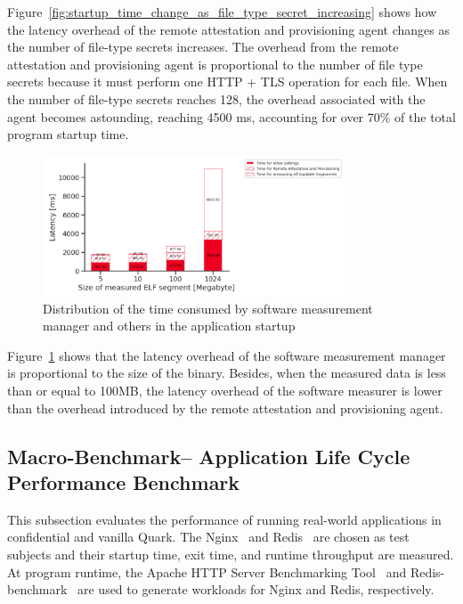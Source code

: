 Figure~\ref{fig:startup_time_change_as_file_type_secret_increasing} shows how the latency overhead of the remote attestation and provisioning agent changes as the number of file-type secrets increases. The overhead from the remote attestation and provisioning agent is proportional to the 
number of file type secrets because it must perform one HTTP + TLS operation for each file. When the number of file-type secrets reaches 128, the overhead associated with the agent becomes astounding, reaching 4500 ms, accounting for over 70\% of the total program startup time.
\begin{figure}[!htb]
    \centering
    \includegraphics[width=0.8\textwidth]{images/startup_time_change_as_elf_size_increasing.PNG}
    \caption[Distribution of the time consumed by software measurement manager and others in the Application Startup]{Distribution of the time consumed by software measurement manager and others in the application startup}
    \label{fig:startup_time_change_as_elf_size_increasing}
\end{figure}


Figure~\ref{fig:startup_time_change_as_elf_size_increasing} shows that the latency overhead of the software measurement manager is proportional to the size of the binary. Besides, when the measured data is less than or equal to 100MB, the latency overhead of the software measurer is lower than the 
overhead introduced by the remote attestation and provisioning agent.


\subsection{Macro-Benchmark– Application Life Cycle Performance Benchmark}
\label{macri_app_start_up}

This subsection evaluates the performance of running real-world applications in confidential and vanilla Quark. The Nginx~\cite*{nginx} and Redis~\cite*{redis} are chosen as test subjects and their startup time, exit time, and runtime throughput are measured. At program runtime, the Apache HTTP 
Server Benchmarking Tool~\cite*{ab} and Redis-benchmark~\cite*{Redis_benchmark} are used to generate workloads for Nginx and Redis, respectively.

